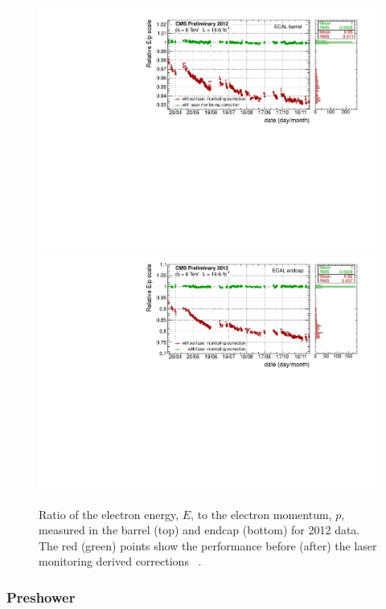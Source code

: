 \begin{figure}
  \includegraphics[width=\textwidth]{ch2_cms_exp/plots/ecal_EB_lasercorrs.pdf} \\
  \includegraphics[width=\textwidth]{ch2_cms_exp/plots/ecal_EE_lasercorrs.pdf} 
  \caption[ECAL laser corrections]{Ratio of the electron energy, $E$, to the electron momentum, $p$, measured in the \CMS barrel (top) and endcap (bottom) for 2012 data. The red (green) points show the performance before (after) the laser monitoring derived corrections ~\cite{cms-ecal-performance-2012}.}
  \label{fig:ecal_laser_corrs}
\end{figure}

\subsubsection{Preshower}

